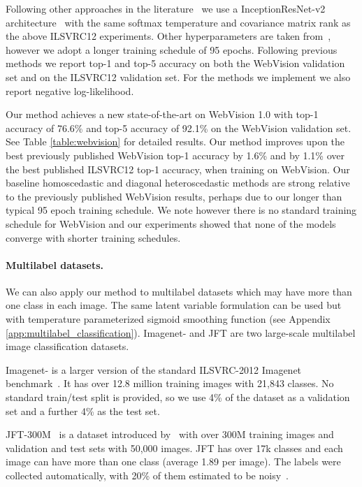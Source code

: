 \documentclass[final]{cvpr}
\begin{document}
Following other approaches in the literature~\cite{MentorNet.2018,guo2018curriculumnet,jiang2020beyond,cao2020heteroskedastic} we use a InceptionResNet-v2 architecture~\cite{inceptionresnet2017} with the same softmax temperature and covariance matrix rank as the above ILSVRC12 experiments. Other hyperparameters are taken from~\citet{jiang2020beyond}, however we adopt a longer training schedule of 95 epochs. Following previous methods we report top-1 and top-5 accuracy on both the WebVision validation set and on the ILSVRC12 validation set. For the methods we implement we also report negative log-likelihood.

Our method achieves a new state-of-the-art on WebVision 1.0 with top-1 accuracy of 76.6\% and top-5 accuracy of 92.1\% on the WebVision validation set. See Table \ref{table:webvision} for detailed results. Our method improves upon the best previously published WebVision top-1 accuracy by 1.6\% and by 1.1\% over the best published ILSVRC12 top-1 accuracy, when training on WebVision. Our baseline homoscedastic and diagonal heteroscedastic methods are strong relative to the previously published WebVision results, perhaps due to our longer than typical 95 epoch training schedule. We note however there is no standard training schedule for WebVision and our experiments showed that none of the models converge with shorter training schedules.

\paragraph{Multilabel datasets.} We can also apply our method to multilabel datasets which may have more than one class in each image. The same latent variable formulation can be used but with temperature parameterized sigmoid smoothing function (see Appendix \ref{app:multilabel_classification}). Imagenet- and JFT are two large-scale multilabel image classification datasets.

Imagenet- is a larger version of the standard ILSVRC-2012 Imagenet benchmark~\cite{deng2009imagenet,kolesnikov2019big,beyer2020we,collier2020analysis}. It has over 12.8 million training images with 21,843 classes. No standard train/test split is provided, so we use 4\% of the dataset as a validation set and a further 4\% as the test set.

JFT-300M~\cite{distillation2015,chollet2017xception,sun2017revisiting,kolesnikov2019big} is a dataset introduced by~\citet{distillation2015} with over 300M training images and validation and test sets with 50,000 images. JFT has over 17k classes and each image can have more than one class (average 1.89 per image). The labels were collected automatically, with 20\% of them estimated to be noisy~\cite{sun2017revisiting}.
\end{document}
